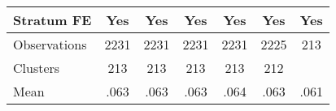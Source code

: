 {\begin{tabular}{l*{6}{c}}
Stratum FE      &      Yes         &      Yes         &      Yes         &      Yes         &      Yes         &      Yes         \\
\midrule
Observations    &     2231         &     2231         &     2231         &     2231         &     2225         &      213         \\
Clusters        &      213         &      213         &      213         &      213         &      212         &                  \\
Mean            &     .063         &     .063         &     .063         &     .064         &     .063         &     .061         \\
\bottomrule
\end{tabular}
}

